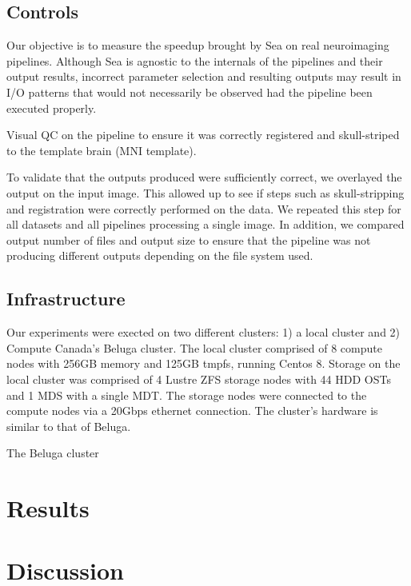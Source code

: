     \subsection{Controls}
    Our objective is to measure the speedup brought by Sea on real neuroimaging pipelines.
    Although Sea is agnostic to the internals of the pipelines and their output results, incorrect parameter
    selection and resulting outputs may result in I/O patterns that would not necessarily be observed had the
    pipeline been executed properly.
    
    Visual QC on the pipeline to ensure it was correctly registered and skull-striped to the template brain (MNI template). 
    
    To validate that the outputs produced were sufficiently correct, we overlayed the output on the input image.
    This allowed up to see if steps such as skull-stripping and registration were correctly performed on the data.
    We repeated this step for all datasets and all pipelines processing a single image. In addition, we compared output
    number of files and output size to ensure that the pipeline was not producing different outputs depending on the file
    system used.
    
    
    \subsection{Infrastructure}
    
    Our experiments were exected on two different clusters: 1) a local cluster and 2) Compute Canada's Beluga cluster.
    The local cluster comprised of 8 compute nodes with 256GB memory and 125GB tmpfs, running Centos 8. Storage on the local
    cluster was comprised of 4 Lustre ZFS storage nodes with 44 HDD OSTs and 1 MDS with a single MDT. The
    storage nodes were connected to the compute nodes via a 20Gbps ethernet connection.
    The cluster's hardware is similar to that of Beluga.
    
    The Beluga cluster
    
    \section{Results}
    
    
    \section{Discussion}
